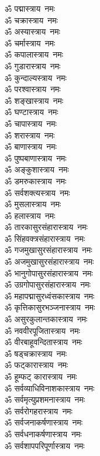 \begin{flushleft}
\begin{multicols}{2}
ॐ पद्मास्त्राय~नमः\\
ॐ चक्रास्त्राय~नमः\\
ॐ अस्यास्त्राय~नमः\\
ॐ चर्मास्त्राय~नमः\hfill{}\\
ॐ कपालास्त्राय~नमः\\
ॐ गुडारास्त्राय~नमः  \\
ॐ कुन्दाल्यस्त्राय~नमः \\
ॐ परश्वास्त्राय~नमः\\
ॐ शङ्खास्त्राय~नमः\\
ॐ घण्टास्त्राय~नमः\\
ॐ चापास्त्राय~नमः\\
ॐ शरास्त्राय~नमः\\
ॐ बाणास्त्राय~नमः\\
ॐ पुष्पबाणास्त्राय~नमः\hfill{}\\
ॐ अङ्कुशास्त्राय~नमः\\
ॐ डमरुकास्त्राय~नमः\\
ॐ सर्वशक्त्यस्त्राय~नमः\\
ॐ मुसलास्त्राय~नमः\\
ॐ हलास्त्राय~नमः\\
ॐ तारकासुरसंहारास्त्राय~नमः\\
ॐ सिंहवक्त्रसंहारास्त्राय~नमः\\
ॐ गजमुखासुरसंहारास्त्राय~नमः\\
ॐ अजमुखासुरसंहारास्त्राय~नमः\\
ॐ भानुगोपासुरसंहारास्त्राय~नमः \hfill{}\\
ॐ उग्रगोपासुरसंहारास्त्राय~नमः \\
ॐ महापद्मासुरध्वंसकास्त्राय~नमः\\
ॐ कृत्तिकासुरभञ्जनास्त्राय~नमः\\
ॐ असुरकुलान्तकास्त्राय~नमः\\
ॐ नववीरपूजितास्त्राय~नमः\\
ॐ वीरबाहूवन्दितास्त्राय~नमः\\
ॐ षड्चक्रास्त्राय~नमः\\
ॐ फट्कारास्त्राय~नमः\\
ॐ हूम्फट् कारास्त्राय~नमः\\
ॐ सर्वव्याधिविनाशकास्त्राय~नमः\hfill{}\\
ॐ सर्वमृत्युप्रशमनास्त्राय~नमः\\
ॐ सर्वरोगहरास्त्राय~नमः\\
ॐ सर्वजनाकर्षणास्त्राय~नमः\\
ॐ सर्वधनाकर्षणास्त्राय~नमः\\
ॐ सर्वशापपरिपूर्णास्त्राय~नमः\\

\end{multicols}
\end{flushleft}
